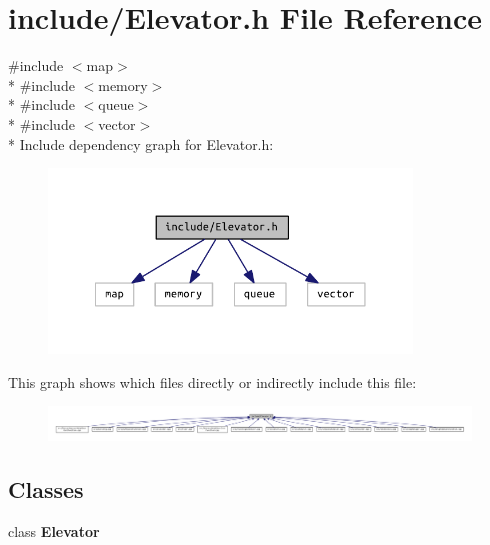 \section{include/\+Elevator.h File Reference}
\label{_elevator_8h}
{\ttfamily \#include $<$map$>$}\\*
{\ttfamily \#include $<$memory$>$}\\*
{\ttfamily \#include $<$queue$>$}\\*
{\ttfamily \#include $<$vector$>$}\\*
Include dependency graph for Elevator.\+h\+:\nopagebreak
\begin{figure}[H]
\begin{center}
\leavevmode
\includegraphics[width=274pt]{_elevator_8h__incl}
\end{center}
\end{figure}
This graph shows which files directly or indirectly include this file\+:\nopagebreak
\begin{figure}[H]
\begin{center}
\leavevmode
\includegraphics[width=350pt]{_elevator_8h__dep__incl}
\end{center}
\end{figure}
\subsection*{Classes}
\begin{DoxyCompactItemize}
\item 
class {\bf Elevator}
\end{DoxyCompactItemize}
